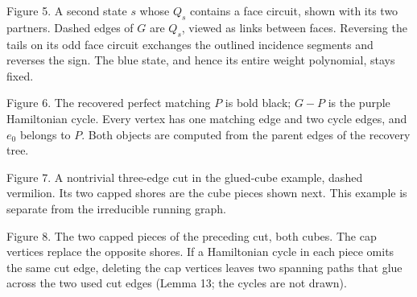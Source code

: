\documentclass[a4paper,11pt]{amsart}
\begin{document}
\clearpage
\begin{center}\begin{minipage}{\textwidth}\centering

\par\smallskip\raggedright\footnotesize Figure 5. A second state $s$ whose $Q_s$ contains a face circuit, shown with its two partners. Dashed edges of $G$ are $Q_s$, viewed as links between faces. Reversing the tails on its odd face circuit exchanges the outlined incidence segments and reverses the sign. The blue state, and hence its entire weight polynomial, stays fixed.
\end{minipage}\end{center}\vspace{5mm}
\begin{center}\begin{minipage}{\textwidth}\centering

\par\smallskip\raggedright\footnotesize Figure 6. The recovered perfect matching $P$ is bold black; $G-P$ is the purple Hamiltonian cycle. Every vertex has one matching edge and two cycle edges, and $e_0$ belongs to $P$. Both objects are computed from the parent edges of the recovery tree.
\end{minipage}\end{center}\vspace{5mm}
\clearpage
\begin{center}\begin{minipage}{\textwidth}\centering

\par\smallskip\raggedright\footnotesize Figure 7. A nontrivial three-edge cut in the glued-cube example, dashed vermilion. Its two capped shores are the cube pieces shown next. This example is separate from the irreducible running graph.
\end{minipage}\end{center}\vspace{5mm}
\begin{center}\begin{minipage}{\textwidth}\centering

\par\smallskip\raggedright\footnotesize Figure 8. The two capped pieces of the preceding cut, both cubes. The cap vertices replace the opposite shores. If a Hamiltonian cycle in each piece omits the same cut edge, deleting the cap vertices leaves two spanning paths that glue across the two used cut edges (Lemma 13; the cycles are not drawn).
\end{minipage}\end{center}\vspace{5mm}
\end{document}
